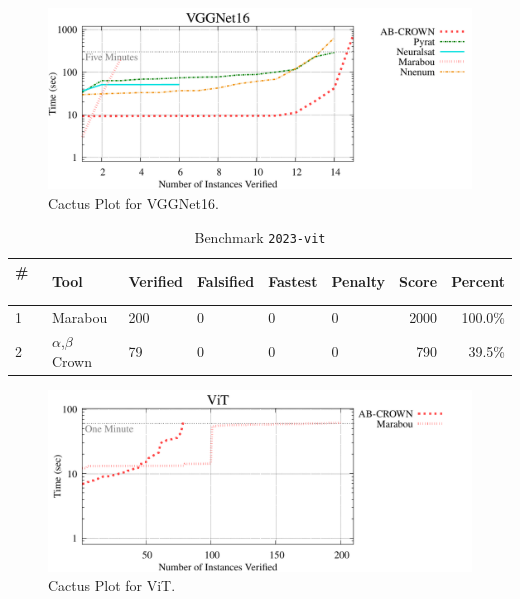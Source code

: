 \begin{figure}[h]
\centerline{\includegraphics[width=\textwidth]{cactus/2023_vggnet16.pdf}}
\caption{Cactus Plot for VGGNet16.}
\label{fig:quantPic}
\end{figure}



\begin{table}[h]
\begin{center}
\caption{Benchmark \texttt{2023-vit}} \label{tab:cat_{cat}}
{\setlength{\tabcolsep}{2pt}
\begin{tabular}[h]{@{}llllllrr@{}}
\toprule
\textbf{\# ~} & \textbf{Tool} & \textbf{Verified} & \textbf{Falsified} & \textbf{Fastest} & \textbf{Penalty} & \textbf{Score} & \textbf{Percent}\\
\midrule
1 & Marabou & 200 & 0 & 0 & 0 & 2000 & 100.0\% \\
2 & $\alpha$,$\beta$ Crown & 79 & 0 & 0 & 0 & 790 & 39.5\% \\
\bottomrule
\end{tabular}
}
\end{center}
\end{table}



\begin{figure}[h]
\centerline{\includegraphics[width=\textwidth]{cactus/2023_vit.pdf}}
\caption{Cactus Plot for ViT.}
\label{fig:quantPic}
\end{figure}


